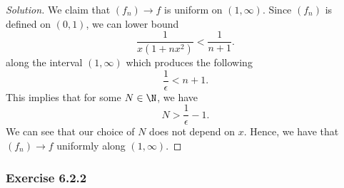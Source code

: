 \begin{enumerate}
        \begin{proof}[Solution]
        We claim that \( (f_n) \to f  \) is uniform on \( (1,\infty )  \). Since \( (f_n)  \) is defined on \( (0,1)  \), we can lower bound 
        \[   \frac{ 1 }{ x (1 +nx^2 ) } < \frac{ 1 }{ n+ 1 }.  \]
        along the interval \( (1,\infty )  \) which produces the following 
        \[  \frac{ 1 }{ \epsilon  }  < n + 1.\]
        This implies that for some \( N \in \N  \), we have 
        \[  N > \frac{ 1 }{ \epsilon  }  - 1. \]
        We can see that our choice of \( N  \) does not depend on \( x  \). Hence, we have that \( (f_n) \to f  \) uniformly along \( (1,\infty ) \).
        \end{proof}
\end{enumerate}

\subsubsection{Exercise 6.2.2} 

